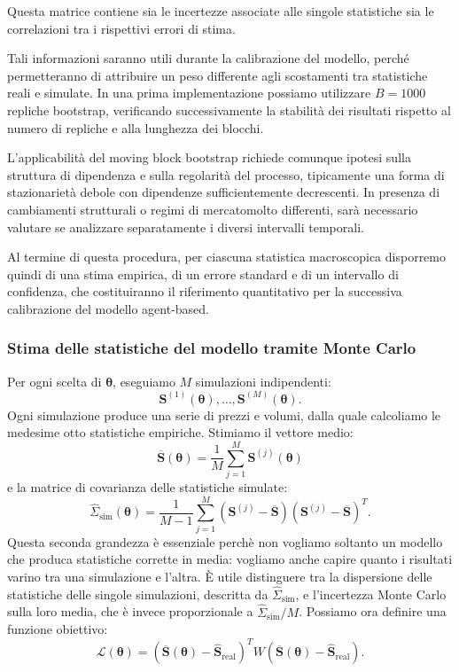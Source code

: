 Questa matrice contiene sia le incertezze associate alle singole statistiche sia le correlazioni tra i rispettivi errori di stima.

Tali informazioni saranno utili durante la calibrazione del modello, perché permetteranno di attribuire un peso differente agli scostamenti tra 
statistiche reali e simulate. In una prima implementazione possiamo utilizzare $B=1000$ repliche bootstrap, verificando successivamente la stabilità 
dei risultati rispetto al numero di repliche e alla lunghezza dei blocchi.

L'applicabilità del moving block bootstrap richiede comunque ipotesi sulla struttura di dipendenza e sulla regolarità del processo, tipicamente una 
forma di stazionarietà debole con dipendenze sufficientemente decrescenti. In presenza di cambiamenti strutturali o regimi di mercatomolto differenti, 
sarà necessario valutare se analizzare separatamente i diversi intervalli temporali.

Al termine di questa procedura, per ciascuna statistica macroscopica disporremo quindi di una stima empirica, di un errore standard e di
un intervallo di confidenza, che costituiranno il riferimento quantitativo per la successiva calibrazione del modello agent-based.

\subsubsection{Stima delle statistiche del modello tramite Monte Carlo}
Per ogni scelta di \(\boldsymbol\theta\), eseguiamo \(M\) simulazioni indipendenti:
\[
\mathbf S^{(1)}(\boldsymbol\theta),
\ldots,
\mathbf S^{(M)}(\boldsymbol\theta).
\]
Ogni simulazione produce una serie di prezzi e volumi, dalla quale calcoliamo le medesime otto statistiche empiriche.
Stimiamo il vettore medio:
\[
\overline{\mathbf S}(\boldsymbol\theta)
=
\frac{1}{M}
\sum_{j=1}^{M}\mathbf S^{(j)}(\boldsymbol\theta)
\]
e la matrice di covarianza delle statistiche simulate:
\[
\widehat\Sigma_{\mathrm{sim}}(\boldsymbol\theta)
=
\frac{1}{M-1}
\sum_{j=1}^{M}
\left(\mathbf S^{(j)}-\overline{\mathbf S}\right)
\left(\mathbf S^{(j)}-\overline{\mathbf S}\right)^T.
\]
Questa seconda grandezza è essenziale perchè non vogliamo soltanto un modello che produca statistiche corrette in media: vogliamo anche capire quanto i 
risultati varino tra una simulazione e l'altra. È utile distinguere tra la dispersione delle statistiche delle singole simulazioni, descritta da 
\(\widehat\Sigma_{\mathrm{sim}}\), e l'incertezza Monte Carlo sulla loro media, che è invece proporzionale a \(\widehat\Sigma_{\mathrm{sim}}/M\).
Possiamo ora definire una funzione obiettivo:
\[
\mathcal L(\boldsymbol\theta)=
\left(
\overline{\mathbf S}(\boldsymbol\theta)
-\widehat{\mathbf S}_{\mathrm{real}}
\right)^T
W
\left(
\overline{\mathbf S}(\boldsymbol\theta)
-\widehat{\mathbf S}_{\mathrm{real}}
\right).
\]

